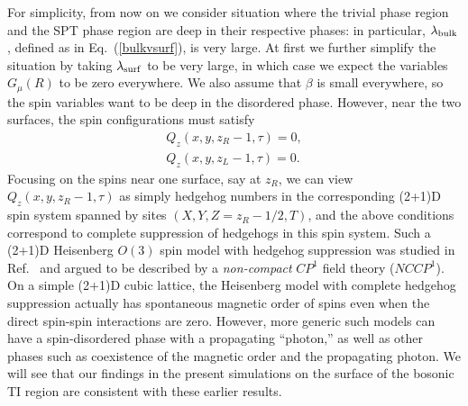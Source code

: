 For simplicity, from now on we consider situation where the trivial phase region and the SPT phase region are deep in their respective phases: in particular, $\lambda_{\rm bulk}$, defined as in Eq.~(\ref{bulkvsurf}), is very large.  At first we further simplify the situation by taking $\lambda_{\rm surf}$ to be very large, in which case we expect the variables $G_\mu(R)$ to be zero everywhere.  We also assume that $\beta$ is small everywhere, so the spin variables want to be deep in the disordered phase.  However, near the two surfaces, the spin configurations must satisfy
\begin{equation}
\begin{array}{c}
Q_z(x, y, z_R-1, \tau) = 0, \\
Q_z(x, y, z_L-1, \tau) = 0.
\end{array}
\end{equation}
Focusing on the spins near one surface, say at $z_R$, we can view $Q_z(x, y, z_R-1, \tau)$ as simply hedgehog numbers in the corresponding (2+1)D spin system spanned by sites $(X, Y, Z=z_R-1/2, T)$, and the above conditions correspond to complete suppression of hedgehogs in this spin system.  Such a (2+1)D Heisenberg $O(3)$ spin model with hedgehog suppression was studied in Ref.~\cite{LesikAshvin} and argued to be described by a \emph{non-compact} $CP^1$ field theory ($NCCP^1$).  On a simple (2+1)D cubic lattice, the Heisenberg model with complete hedgehog suppression actually has spontaneous magnetic order of spins even when the direct spin-spin interactions are zero.\cite{LauDasgupta, KamalMurthy}  However, more generic such models can have a spin-disordered phase with a propagating ``photon,''\cite{KamalMurthy, LesikAshvin} as well as other phases such as coexistence of the magnetic order and the propagating photon.\cite{LesikAshvin2}  We will see that our findings in the present simulations on the surface of the bosonic TI region are consistent with these earlier results.

